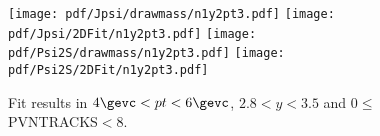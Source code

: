 \begin{figure}[H]
\begin{center}
\texttt{[image: pdf/Jpsi/drawmass/n1y2pt3.pdf]}
\texttt{[image: pdf/Jpsi/2DFit/n1y2pt3.pdf]}
\vspace*{-0.5cm}
\texttt{[image: pdf/Psi2S/drawmass/n1y2pt3.pdf]}
\texttt{[image: pdf/Psi2S/2DFit/n1y2pt3.pdf]}
\vspace*{-0.5cm}
\end{center}
\caption{Fit results in $4\gevc<pt<6\gevc$, $2.8<y<3.5$ and 0$\leq$PVNTRACKS$<$8.}
\label{Fitn1y2pt3}
\end{figure}
